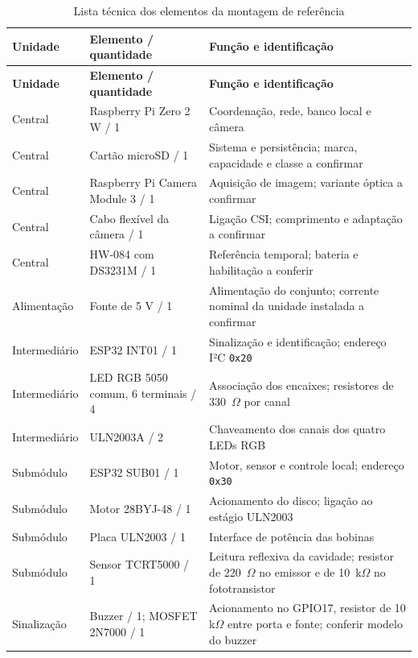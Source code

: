 {\small\setlength{\tabcolsep}{3pt}\begin{longtable}{p{}p{}p{}}
\caption{Lista técnica dos elementos da montagem de referência}\label{tab:materiais-instalados}\\
\hline\textbf{Unidade} & \textbf{Elemento / quantidade} & \textbf{Função e identificação}\\\hline\endfirsthead
\hline\textbf{Unidade} & \textbf{Elemento / quantidade} & \textbf{Função e identificação}\\\hline\endhead
Central & Raspberry Pi Zero 2 W / 1 & Coordenação, rede, banco local e câmera\\\hline
Central & Cartão microSD / 1 & Sistema e persistência; marca, capacidade e classe a confirmar\\\hline
Central & Raspberry Pi Camera Module 3 / 1 & Aquisição de imagem; variante óptica a confirmar\\\hline
Central & Cabo flexível da câmera / 1 & Ligação CSI; comprimento e adaptação a confirmar\\\hline
Central & HW-084 com DS3231M / 1 & Referência temporal; bateria e habilitação a conferir\\\hline
Alimentação & Fonte de 5 V / 1 & Alimentação do conjunto; corrente nominal da unidade instalada a confirmar\\\hline
Intermediário & ESP32 INT01 / 1 & Sinalização e identificação; endereço I²C \texttt{0x20}\\\hline
Intermediário & LED RGB 5050 comum, 6 terminais / 4 & Associação dos encaixes; resistores de 330~$\Omega$ por canal\\\hline
Intermediário & ULN2003A / 2 & Chaveamento dos canais dos quatro LEDs RGB\\\hline
Submódulo & ESP32 SUB01 / 1 & Motor, sensor e controle local; endereço \texttt{0x30}\\\hline
Submódulo & Motor 28BYJ-48 / 1 & Acionamento do disco; ligação ao estágio ULN2003\\\hline
Submódulo & Placa ULN2003 / 1 & Interface de potência das bobinas\\\hline
Submódulo & Sensor TCRT5000 / 1 & Leitura reflexiva da cavidade; resistor de 220~$\Omega$ no emissor e de 10~k$\Omega$ no fototransistor\\\hline
Sinalização & Buzzer / 1; MOSFET 2N7000 / 1 & Acionamento no GPIO17, resistor de 10 k$\Omega$ entre porta e fonte; conferir modelo do buzzer\\\hline

\end{longtable}}
